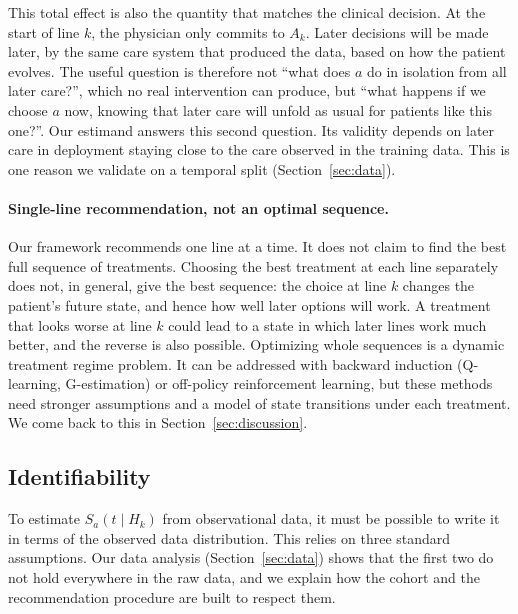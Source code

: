\documentclass[a4paper,10pt]{article}
\begin{document}
This total effect is also the quantity that matches the clinical decision. At the start of line $k$, the physician only commits to $A_k$. Later decisions will be made later, by the same care system that produced the data, based on how the patient evolves. The useful question is therefore not ``what does $a$ do in isolation from all later care?'', which no real intervention can produce, but ``what happens if we choose $a$ now, knowing that later care will unfold as usual for patients like this one?''. Our estimand answers this second question. Its validity depends on later care in deployment staying close to the care observed in the training data. This is one reason we validate on a temporal split (Section~\ref{sec:data}).

\paragraph{Single-line recommendation, not an optimal sequence.}
Our framework recommends one line at a time. It does not claim to find the best full sequence of treatments. Choosing the best treatment at each line separately does not, in general, give the best sequence: the choice at line $k$ changes the patient's future state, and hence how well later options will work. A treatment that looks worse at line $k$ could lead to a state in which later lines work much better, and the reverse is also possible. Optimizing whole sequences is a dynamic treatment regime problem. It can be addressed with backward induction (Q-learning, G-estimation) or off-policy reinforcement learning, but these methods need stronger assumptions and a model of state transitions under each treatment. We come back to this in Section~\ref{sec:discussion}.

\subsection{Identifiability}
\label{sec:identifiability}

To estimate $S_a(t \mid H_k)$ from observational data, it must be possible to write it in terms of the observed data distribution. This relies on three standard assumptions. Our data analysis (Section~\ref{sec:data}) shows that the first two do not hold everywhere in the raw data, and we explain how the cohort and the recommendation procedure are built to respect them.
\end{document}
